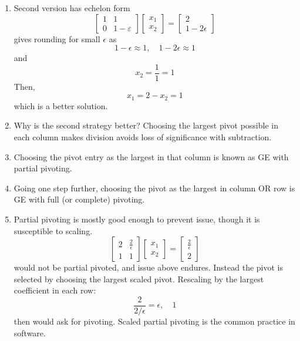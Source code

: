 \documentclass{article}
\theoremstyle{remark}
\begin{document}
\begin{enumerate}
\begin{enumerate}
\item Second version has echelon form
$$
\begin{bmatrix}
1 & 1\\
0 & 1-\varepsilon
\end{bmatrix}
\begin{bmatrix}
x_1\\x_2
\end{bmatrix} = \begin{bmatrix}
2\\1 - \displaystyle 2\epsilon
\end{bmatrix}
$$
gives rounding for small $\epsilon$ as
\[
1-\epsilon \approx 1, \quad 
1- 2\epsilon \approx 1
\]
and 
\[
x_2 = \frac{1}{1} = 1
\]
Then, 
\[
x_1 = 2-x_2 = 1
\]
which is a better solution.
\item Why is the second strategy better? Choosing the largest pivot possible in each column makes division avoids loss of significance with subtraction.

\item Choosing the pivot entry as the largest in that column is known as GE with partial pivoting. 

\item Going one step further, choosing the pivot as the largest in column OR row is GE with full (or complete) pivoting. 

\item Partial pivoting is mostly good enough to prevent issue, though it is susceptible to scaling.
$$
\begin{bmatrix}
2 & \frac{2}{\epsilon}\\
1 & 1
\end{bmatrix}
\begin{bmatrix}
x_1\\x_2
\end{bmatrix} = \begin{bmatrix}
\frac{2}{\epsilon} \\ 2
\end{bmatrix}
$$
would not be partial pivoted, and issue above endures. Instead the pivot is selected by choosing the largest scaled pivot. Rescaling by the largest coefficient in each row:
\[
\frac{2}{2/\epsilon} = \epsilon, \quad 1
\]
then would ask for pivoting. Scaled partial pivoting is the common practice in software.


\end{enumerate}
\end{enumerate}
\end{document}
